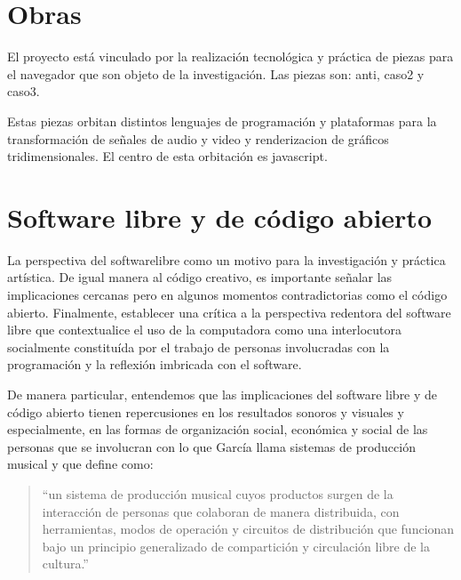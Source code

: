 \section{Obras}

El proyecto está vinculado por la realización tecnológica y práctica de piezas para el navegador que son objeto de la investigación. Las piezas son: anti, caso2 y caso3.

Estas piezas orbitan distintos lenguajes de programación y plataformas para la transformación de señales de audio y video y renderizacion de gráficos tridimensionales. El centro de esta orbitación es javascript.


\section{Software libre y de código abierto}

La perspectiva del softwarelibre como un motivo para la investigación y práctica artística. De igual manera al código creativo, es importante señalar las implicaciones cercanas pero en algunos momentos contradictorias como el código abierto. Finalmente, establecer una crítica a la perspectiva redentora del software libre que contextualice el uso de la computadora como una interlocutora socialmente constituída por el trabajo de personas involucradas con la programación y la reflexión imbricada con el software.


De manera particular, entendemos que las implicaciones del software libre y de código abierto tienen repercusiones en los resultados sonoros y visuales y especialmente, en las formas de organización social, económica y social de las personas que se involucran con lo que García llama sistemas de producción musical y que define como:

\begin{quote}

  ``un sistema de producción musical cuyos productos surgen de la interacción de personas que colaboran de manera distribuida, con herramientas, modos de operación y circuitos de distribución que funcionan bajo un principio generalizado de compartición y circulación libre de la cultura.''\citep[p.~65]{jorgeDavid2021}

\end{quote}

